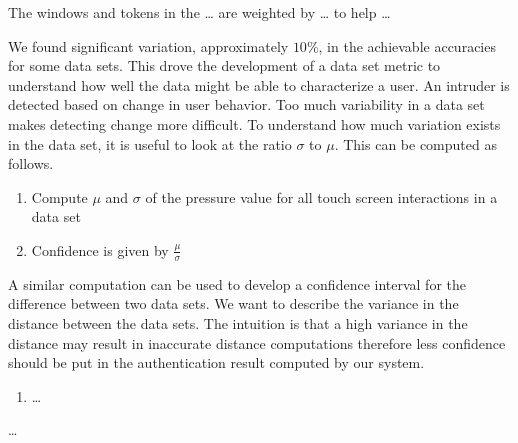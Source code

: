 %
The windows and tokens in the \dots 
are weighted by \dots
to help \dots

We found significant variation, approximately $10\%$, 
in the achievable accuracies for some data sets.
This drove the development of a data set metric to
understand how well the data might be able to characterize a user.
%
An intruder is detected based on change in user behavior.
Too much variability in a data set makes
detecting change more difficult.
%
To understand how much variation exists in the data set,
it is useful to look at the ratio $\sigma$ to $\mu$.
This can be computed as follows.
\begin{enumerate}
\item Compute $\mu$ and $\sigma$ of the pressure value for 
  all touch screen interactions in a data set
\item Confidence is given by $\frac{\mu}{\sigma}$
\end{enumerate}
%

A similar computation can be used to develop 
a confidence interval for the difference between two data sets.
%
We want to describe the variance in the distance 
between the data sets.
The intuition is that a high variance in the distance
may result in inaccurate distance computations therefore
less confidence should be put in the authentication result 
computed by our system.
%
\begin{enumerate}
\item \dots
\end{enumerate}
\dots


